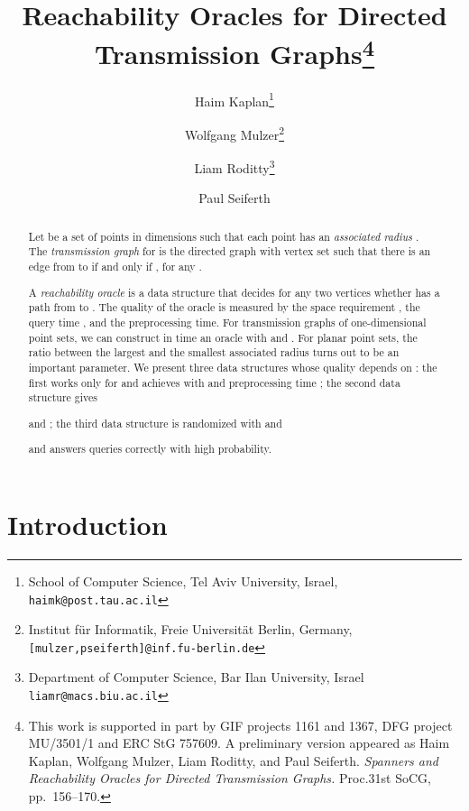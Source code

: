 \documentclass[11pt,a4paper]{paper}
\title{Reachability Oracles for Directed
  Transmission Graphs\footnote{ 
  This work is supported in part by GIF
  projects 1161 and 1367, DFG project MU/3501/1 and 
  ERC StG 757609.
  A preliminary version appeared as
  Haim Kaplan, Wolfgang Mulzer, Liam Roditty, and Paul Seiferth.
  \emph{Spanners and Reachability Oracles for Directed Transmission Graphs.}
  Proc.\@ 31st SoCG, pp.~156--170.}}
\author{Haim Kaplan\thanks{School of Computer Science, Tel Aviv University,
 Israel, \texttt{haimk@post.tau.ac.il}} \and
 Wolfgang Mulzer\thanks{Institut f\"ur Informatik,
Freie Universit\"at Berlin,
  Germany,
  \texttt{[mulzer,pseiferth]@inf.fu-berlin.de}} \and
Liam Roditty\thanks{Department of Computer Science, Bar Ilan University,
  Israel
  \texttt{liamr@macs.biu.ac.il}} \and
Paul Seiferth\footnotemark[3]}
\begin{document}
\maketitle

\begin{abstract}
Let  be a set of  points
in  dimensions
such that each point  has an
\emph{associated radius} .
The \emph{transmission graph}  for  is the
directed graph with vertex set
 such that there is
an edge from  to  if and only if
, for any .

A \emph{reachability oracle} is a data structure
that decides for any two vertices 
whether  has a path from  to .
The quality of the oracle is measured
by the space requirement ,
the query time , and the preprocessing time.
For transmission graphs of one-dimensional point sets, we 
can construct in  time
an oracle with  and .
For planar point sets, the ratio  between the largest and
the smallest associated radius turns out to be an important
parameter. We present three data
structures whose quality depends on :
the first works only for  and achieves  with
 and preprocessing time ;
the second data structure gives

 and ;
the third data structure is randomized with
 and

and answers queries correctly with high probability.
\end{abstract}

\section{Introduction}
\end{document}
